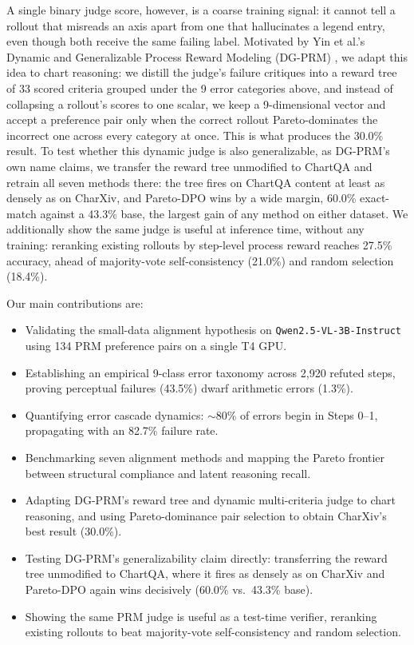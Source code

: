 \documentclass[11pt]{article}
\begin{document}
A single binary judge score, however, is a coarse training signal: it cannot tell a rollout that misreads an axis apart from one that hallucinates a legend entry, even though both receive the same failing label. Motivated by Yin et al.'s Dynamic and Generalizable Process Reward Modeling (DG-PRM) \citep{yin2024dgprm}, we adapt this idea to chart reasoning: we distill the judge's failure critiques into a reward tree of 33 scored criteria grouped under the 9 error categories above, and instead of collapsing a rollout's scores to one scalar, we keep a 9-dimensional vector and accept a preference pair only when the correct rollout Pareto-dominates the incorrect one across every category at once. This is what produces the 30.0\% result. To test whether this dynamic judge is also generalizable, as DG-PRM's own name claims, we transfer the reward tree unmodified to ChartQA and retrain all seven methods there: the tree fires on ChartQA content at least as densely as on CharXiv, and Pareto-DPO wins by a wide margin, 60.0\% exact-match against a 43.3\% base, the largest gain of any method on either dataset. We additionally show the same judge is useful at inference time, without any training: reranking existing rollouts by step-level process reward reaches 27.5\% accuracy, ahead of majority-vote self-consistency (21.0\%) and random selection (18.4\%).

Our main contributions are:
\begin{itemize}[noitemsep,topsep=0pt]
    \item Validating the small-data alignment hypothesis on \texttt{Qwen2.5-VL-3B-Instruct} using 134 PRM preference pairs on a single T4 GPU.
    \item Establishing an empirical 9-class error taxonomy across 2,920 refuted steps, proving perceptual failures (43.5\%) dwarf arithmetic errors (1.3\%).
    \item Quantifying error cascade dynamics: $\sim$80\% of errors begin in Steps 0--1, propagating with an 82.7\% failure rate.
    \item Benchmarking seven alignment methods and mapping the Pareto frontier between structural compliance and latent reasoning recall.
    \item Adapting DG-PRM's reward tree and dynamic multi-criteria judge to chart reasoning, and using Pareto-dominance pair selection to obtain CharXiv's best result (30.0\%).
    \item Testing DG-PRM's generalizability claim directly: transferring the reward tree unmodified to ChartQA, where it fires as densely as on CharXiv and Pareto-DPO again wins decisively (60.0\% vs.\ 43.3\% base).
    \item Showing the same PRM judge is useful as a test-time verifier, reranking existing rollouts to beat majority-vote self-consistency and random selection.
\end{itemize}
\end{document}

